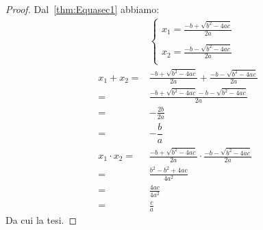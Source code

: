 \begin{proof}Dal~\vref{thm:Equasec1} abbiamo:
	\begin{align*}
	&\begin{cases}
	x_1=\frac{-b+\sqrt{b^2-4ac}}{2a}\\
	\\
	x_2=\frac{-b-\sqrt{b^2-4ac}}{2a}\\
	\end{cases}\\
	x_1+x_2=&\frac{-b+\sqrt{b^2-4ac}}{2a}+\frac{-b-\sqrt{b^2-4ac}}{2a}\\
	=&\frac{-b+\sqrt{b^2-4ac}-b-\sqrt{b^2-4ac}}{2a}\\
	=&-\frac{2b}{2a}\\
	=&-\dfrac{b}{a}\\
	x_1\cdot x_2=&\frac{-b+\sqrt{b^2-4ac}}{2a}\cdot\frac{-b-\sqrt{b^2-4ac}}{2a}\\
	=&\frac{b^2-b^2+4ac}{4a^2}\\
	=&\frac{4ac}{4a^2}\\
	=&\frac{c}{a}
	\end{align*}
	Da cui la tesi.
\end{proof}
